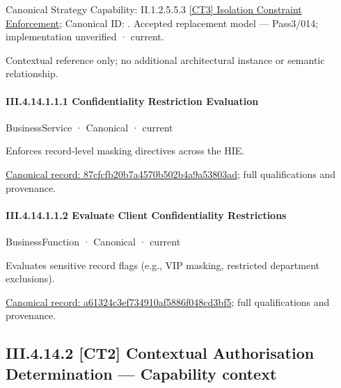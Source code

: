 {\small Canonical Strategy Capability: II.1.2.5.5.3 \hyperref[element:2475396dd27745fe80df6c887c064f8a]{[CT3] Isolation Constraint Enforcement}; Canonical ID: \texttt{}. Accepted replacement model — Pass3/014; implementation unverified · current.}\par
Contextual reference only; no additional architectural instance or semantic relationship.\par
\paragraph*{III.4.14.1.1.1 Confidentiality Restriction Evaluation}
\label{navigation:III.4.14.1.1.1}

\label{element:87cfcfb20b7a4570b502b4a9a53803ad}
{\small BusinessService · Canonical · current}\par

Enforces record-level masking directives across the HIE.


{\footnotesize \href{../../../../../../../../continuum/business/business-service/87cfcfb20b7a4570b502b4a9a53803ad.md}{Canonical record: 87cfcfb20b7a4570b502b4a9a53803ad}; full qualifications and provenance.}\par
\paragraph*{III.4.14.1.1.2 Evaluate Client Confidentiality Restrictions}
\label{navigation:III.4.14.1.1.2}

\label{element:a61324c3ef734910af5886f048cd3bf5}
{\small BusinessFunction · Canonical · current}\par

Evaluates sensitive record flags (e.g., VIP masking, restricted department exclusions).


{\footnotesize \href{../../../../../../../../continuum/business/business-function/a61324c3ef734910af5886f048cd3bf5.md}{Canonical record: a61324c3ef734910af5886f048cd3bf5}; full qualifications and provenance.}\par
\subsection*{III.4.14.2 [CT2] Contextual Authorisation Determination — Capability context}
\label{navigation:III.4.14.2}

